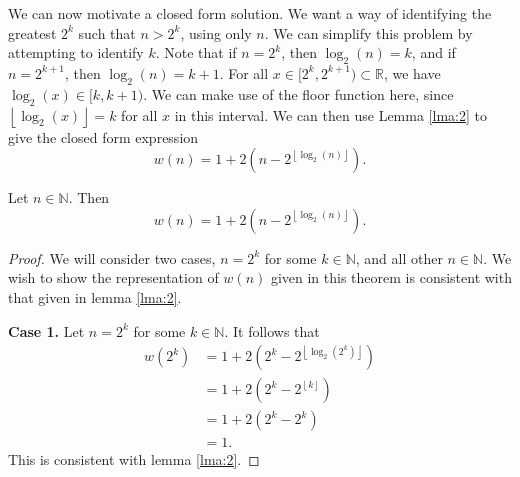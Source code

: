 \documentclass[11pt, letterpaper]{article}
\begin{document}
We can now motivate a closed form solution. We want a way of identifying the greatest $2^k$ such that $n>2^k$, using only $n$. We can simplify this problem by attempting to identify $k$. Note that if $n=2^k$, then $\log_2(n)=k$, and if $n=2^{k+1}$, then $\log _2(n)=k+1$. For all $x\in [2^k,2^{k+1})\subset \mathbb{R}$, we have $\log_2(x)\in [k,k+1)$. We can make use of the floor function here, since $\left\lfloor \log_2(x) \right\rfloor=k$ for all $x$ in this interval. We can then use Lemma \ref{lma:2} to give the closed form expression
\[
	w(n)=1+2\left( n-2^{\left\lfloor \log_2(n) \right\rfloor} \right) 
.\]
\begin{theorem}\label{thm:1}
	Let $n\in\mathbb{N}$. Then
	\[
		w(n)=1+2\left( n-2^{\left\lfloor \log _2(n) \right\rfloor} \right) 
	.\]
\end{theorem}
\begin{proof}
	We will consider two cases, $n=2^k$ for some $k\in\mathbb{N}$, and all other $n\in\mathbb{N}$. We wish to show the representation of $w(n)$ given in this theorem is consistent with that given in lemma \ref{lma:2}.

	\textbf{Case 1.} Let $n=2^k$ for some $k\in\mathbb{N}$. It follows that
	\begin{align*}
		w\left( 2^k \right) &=1+2\left( 2^k-2^{\left\lfloor\log_2\left( 2^k \right)\right\rfloor } \right) \\
				    &=1+2\left( 2^k-2^{\left\lfloor k \right\rfloor} \right) \\
				    &=1+2\left( 2^k-2^k \right) \\
				    &=1
	.\end{align*}
	This is consistent with lemma \ref{lma:2}.


\end{proof}
\end{document}
